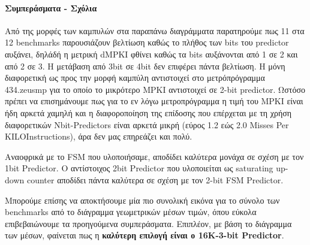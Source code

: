 \paragraph{Συμπεράσματα - Σχόλια}
    Από της μορφές των καμπυλών στα παραπάνω διαγράμματα παρατηρούμε πως 11 στα
    12 benchmarks παρουσιάζουν βελτίωση καθώς το πλήθος των bits του predictor
    αυξάνει, δηλάδή η μετρική dMPKI φθίνει καθώς τα bits αυξάνονται από 1 σε 2
    και από 2 σε 3. Η μετάβαση από 3bit σε 4bit δεν επιφέρει πάντα βελτίωση. Η
    μόνη διαφορετική ως προς την μορφή καμπύλη αντιστοιχεί στο μετρόπρόγραμμα
    434.zeusmp για το οποίο το μικρότερο MPKI αντιστοιχεί σε 2-bit predictor.
    Ωστόσο πρέπει να επισημάνουμε πως για το εν λόγω μετροπρόγραμμα η τιμή του
    MPKI είναι ήδη αρκετά χαμηλή και η διαφοροποίηση της επίδοσης που επέρχεται
    με τη χρήση διαφορετικών Nbit-Predictors είναι αρκετά μικρή (εύρος 1.2 εώς
    2.0 Misses Per KILOInstructions), άρα δεν μας επηρεάζει και πολύ.
    
    Αναοφρικά με το FSM που υλοποιήσαμε, αποδίδει καλύτερα μονάχα σε σχέση με
    τον 1bit Predictor. O αντίστοιχος 2bit Predictor που υλοποιείται ως
    saturating up-down counter αποδίδει πάντα καλύτερα σε σχέση με τον 2-bit FSM
    Predictor.
    
    Μπορούμε επίσης να αποκτήσουμε μία πιο συνολική εικόνα για το σύνολο των
    benchmarks από το διάγραμμα γεωμετρικών μέσων τιμών, όπου εύκολα
    επιβεβαιώνουμε τα προηγούμενα συμπεράσματα.  Επιπλέον, με βάση το διάγραμμα
    των μέσων, φαίνεται πως η \textbf{καλύτερη επιλογή είναι ο 16K-3-bit Predictor}.

